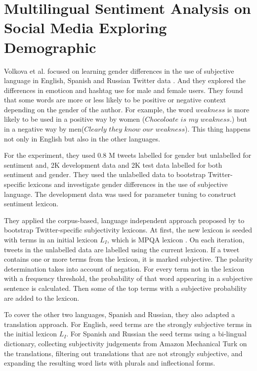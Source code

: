 \section{Multilingual Sentiment Analysis on Social Media Exploring Demographic} 
Volkova et al. focused on learning gender differences in the use of subjective language in English, Spanish and Russian Twitter data \cite{gender_analysis}.
And they explored the differences in emoticon and hashtag use for male and female users.
They found that some words are more or less likely to be positive or negative context depending on the gender of the author.
For example, the word $weakness$ is more likely to be used in a positive way by women ($Chocoloate$ $is$ $my$ $weakness$.) but in a negative way by men($Clearly$ $they$ $know$ $our$ $weakness$).
This thing happens not only in English but also in the other languages.

For the experiment, they used 0.8 M tweets labelled for gender but unlabelled for sentiment and, 2K development data and 2K test data labelled for both sentiment and gender.
They used the unlabelled data to bootstrap Twitter-specific lexicons and investigate gender differences in the use of subjective language.
The development data was used for parameter tuning to construct sentiment lexicon. 

They applied the corpus-based, language independent approach proposed by \cite{twitter_lexicon} to bootstrap Twitter-specific subjectivity lexicons.
At first, the new lexicon is seeded with terms in an initial lexicon $L_I$, which is MPQA lexicon \cite{mpqa}. 
On each iteration, tweets in the unlabelled data are labelled using the current lexicon.
If a tweet contains one or more terms from the lexicon, it is marked subjective.
The polarity determination takes into account of negation.
For every term not in the lexicon with a frequency threshold, the probability of that word appearing in a subjective sentence is calculated.
Then some of the top terms with a subjective probability are added to the lexicon.

To cover the other two languages, Spanish and Russian, they also adapted a translation approach. 
For English, seed terms are the strongly subjective terms in the initial lexicon $L_I$.
For Spanish and Russian the seed terms using a bi-lingual dictionary, collecting subjectivity judgements from Amazon Mechanical Turk on the translations, filtering out translations that are not strongly subjective, and expanding the resulting word lists with plurals and inflectional forms.


